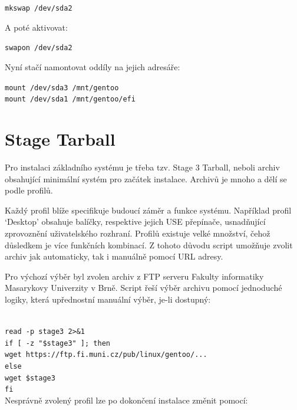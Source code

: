 \documentclass[12pt,a4paper,twoside,]{article}
\begin{document}
{\texttt{mkswap /dev/sda2}

\hspace*{-1.5em}A poté aktivovat:

\texttt{swapon /dev/sda2}

\hspace*{-1.5em}Nyní stačí namontovat oddíly na jejich adresáře:

\texttt{mount /dev/sda3 /mnt/gentoo}\\
\texttt{\hspace*{1.5em}mount /dev/sda1 /mnt/gentoo/efi}

\newpage
\section{Stage Tarball}
{Pro instalaci základního systému je třeba tzv. Stage 3 Tarball, neboli archiv obsahující
minimální systém pro začátek instalace. Archivů je mnoho a dělí se podle profilů.

\hspace*{-1.5em}Každý profil blíže specifikuje budoucí záměr a funkce systému. Například profil
‘Desktop’ obsahuje balíčky, respektive jejich USE přepínače, usnadňující zprovoznění
uživatelského rozhraní.
Profilů existuje velké množství, čehož důsledkem je více funkčních kombinací. Z
tohoto důvodu script umožňuje zvolit archiv jak automaticky, tak i manuálně pomocí
URL adresy. 

\hspace*{-1.5em}Pro výchozí výběr byl zvolen archiv z FTP serveru Fakulty informatiky
Masarykovy Univerzity v Brně. Script řeší výběr archivu pomocí jednoduché logiky,
která upřednostní manuální výběr, je-li dostupný:}\\

\texttt{\hspace*{-1.5em}read -p stage3 2>\&1}\\
\texttt{if [ -z "\$stage3" ]; then}\\
\texttt{\hspace*{+1.5em}wget https://ftp.fi.muni.cz/pub/linux/gentoo/...\\}
\texttt{else}\\
\texttt{\hspace*{+1.5em}wget \$stage3}\\
\texttt{fi}\\

{\hspace*{-1.5em}Nesprávně zvolený profil lze po dokončení instalace změnit pomocí:\\}

}
\end{document}
